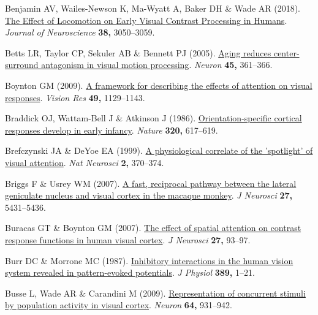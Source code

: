 \documentclass[
  letterpaper,
  DIV=11,
  numbers=noendperiod]{scrartcl}
\newlength{\cslhangindent}
\newenvironment{CSLReferences}[2] %
 {\begin{list}{}{%
  \setlength{\itemindent}{0pt}
  \setlength{\leftmargin}{0pt}
  \setlength{\parsep}{0pt}
  \ifodd #1
   \setlength{\leftmargin}{\cslhangindent}
   \setlength{\itemindent}{-1\cslhangindent}
  \fi
  \setlength{\itemsep}{#2\baselineskip}}}
 {\end{list}}
\begin{document}
\begin{CSLReferences}{1}{1}
Benjamin AV, Wailes-Newson K, Ma-Wyatt A, Baker DH \& Wade AR (2018).
\href{https://doi.org/10.1523/JNEUROSCI.1428-17.2017}{The {Effect} of
{Locomotion} on {Early} {Visual} {Contrast} {Processing} in {Humans}}.
\emph{Journal of Neuroscience} \textbf{38,} 3050--3059.

Betts LR, Taylor CP, Sekuler AB \& Bennett PJ (2005).
\href{https://doi.org/10.1016/j.neuron.2004.12.041}{Aging reduces
center-surround antagonism in visual motion processing}. \emph{Neuron}
\textbf{45,} 361--366.

Boynton GM (2009). \href{https://doi.org/10.1016/j.visres.2008.11.001}{A
framework for describing the effects of attention on visual responses}.
\emph{Vision Res} \textbf{49,} 1129--1143.

Braddick OJ, Wattam-Bell J \& Atkinson J (1986).
\href{https://doi.org/10.1038/320617a0}{Orientation-specific cortical
responses develop in early infancy}. \emph{Nature} \textbf{320,}
617--619.

Brefczynski JA \& DeYoe EA (1999). \href{https://doi.org/10.1038/7280}{A
physiological correlate of the 'spotlight' of visual attention}.
\emph{Nat Neurosci} \textbf{2,} 370--374.

Briggs F \& Usrey WM (2007).
\href{https://doi.org/10.1523/JNEUROSCI.1035-07.2007}{A fast, reciprocal
pathway between the lateral geniculate nucleus and visual cortex in the
macaque monkey}. \emph{J Neurosci} \textbf{27,} 5431--5436.

Buracas GT \& Boynton GM (2007).
\href{https://doi.org/10.1523/JNEUROSCI.3162-06.2007}{The effect of
spatial attention on contrast response functions in human visual
cortex}. \emph{J Neurosci} \textbf{27,} 93--97.

Burr DC \& Morrone MC (1987).
\href{https://doi.org/10.1113/jphysiol.1987.sp016643}{Inhibitory
interactions in the human vision system revealed in pattern-evoked
potentials}. \emph{J Physiol} \textbf{389,} 1--21.

Busse L, Wade AR \& Carandini M (2009).
\href{https://doi.org/10.1016/j.neuron.2009.11.004}{Representation of
concurrent stimuli by population activity in visual cortex}.
\emph{Neuron} \textbf{64,} 931--942.


\end{CSLReferences}
\end{document}
